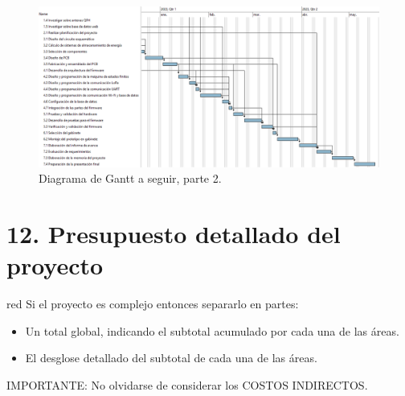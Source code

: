 \documentclass[
11pt, %
codirector, %
]{charter}
\begin{document}
\begin{landscape}
\begin{figure}[htpb]
\centering 
\includegraphics[height=.7\textheight]{./Figuras/Diagrama Gantt sin tareas en paralelo 2.png}
\caption{Diagrama de Gantt a seguir, parte 2.}
\label{fig:diagGantt4}
\end{figure}
\end{landscape}


\section{12. Presupuesto detallado del proyecto}
\label{sec:presupuesto}

\begin{consigna}{red}
Si el proyecto es complejo entonces separarlo en partes:
\begin{itemize}
	\item Un total global, indicando el subtotal acumulado por cada una de las áreas.
	\item El desglose detallado del subtotal de cada una de las áreas.
\end{itemize}

IMPORTANTE: No olvidarse de considerar los COSTOS INDIRECTOS.

\end{consigna}
\end{document}
